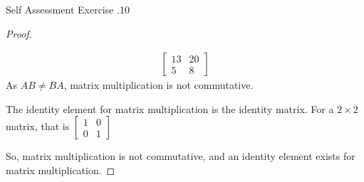 \documentclass[\main/notes.tex]{subfiles}
\begin{document}
\begin{exercise}{Self Assessment Exercise \thechapter.10}
\begin{enumerate}
\begin{proof}
\begin{subproof}
\begin{align*}
\begin{bmatrix}
											13 & 20\\
											5 & 8
										\end{bmatrix}
									\end{align*}
									As $AB \neq BA$, matrix multiplication is not commutative.
								\end{subproof}
								\begin{subproof}[Identity]
									The identity element for matrix multiplication is the identity matrix. For a $2 \times 2$ matrix, that is $\begin{bmatrix}1 & 0 \\ 0 & 1\end{bmatrix}$
								\end{subproof}
								So, matrix multiplication is not commutative, and an identity element exists for matrix multiplication.
							\end{proof}
					\end{enumerate}
				\end{exercise}
\end{document}
